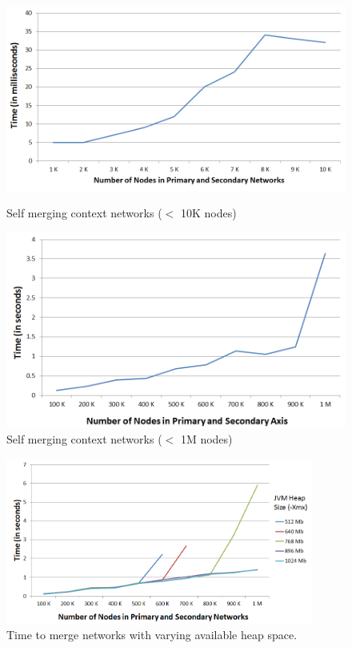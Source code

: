 \begin{figure}[ht]
\begin{minipage}[b]{0.45\linewidth}
\centering
\includegraphics[width=\textwidth]{media/chapter5/axis/perf/selfmerge_10K.png}
\caption{Self merging context networks ($<$ 10K nodes)}
\label{fig:1k-self-merge}
\end{minipage}
\hspace{0.5cm}
\begin{minipage}[b]{0.45\linewidth}
\centering
\includegraphics[width=\textwidth]{media/chapter5/axis/perf/selfmerge_1M.png}
\caption{Self merging context networks ($<$ 1M nodes)}
\label{fig:1m-self-merge}
\end{minipage}
\end{figure}

\begin{figure}[t]
\centering
\includegraphics[width=0.9\textwidth]{media/chapter5/axis/perf/selfmerge-increasing-xmx.png}
\caption{Time to merge networks with varying available heap space.}
\label{fig:agg-xmx}
\end{figure}


